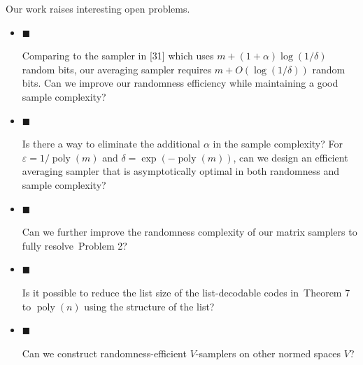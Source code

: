 \documentclass[10pt,a4paper]{article}
\begin{document}
Our work raises interesting open problems.\par


\begin{itemize}


\item[] 
$\blacksquare$ 


Comparing to the sampler in [31] which uses $m+(1+\alpha)\log(1/\delta)$ random bits, our averaging sampler requires $m+O(\log(1/\delta))$ random bits. Can we improve our randomness efficiency while maintaining a good sample complexity?\par





\item[] 
$\blacksquare$ 


Is there a way to eliminate the additional $\alpha$ in the sample complexity? For $\varepsilon=1/\operatorname*{poly}(m)$ and $\delta=\exp(-\operatorname*{poly}(m))$, can we design an efficient averaging sampler that is asymptotically optimal in both randomness and sample complexity?\par





\item[] 
$\blacksquare$ 


Can we further improve the randomness complexity of our matrix samplers to fully resolve Problem 2?\par





\item[] 
$\blacksquare$ 


Is it possible to reduce the list size of the list-decodable codes in Theorem 7 to $\operatorname*{poly}(n)$ using the structure of the list?\par





\item[] 
$\blacksquare$ 


Can we construct randomness-efficient $V$-samplers on other normed spaces $V$?\par





\end{itemize}
\end{document}
